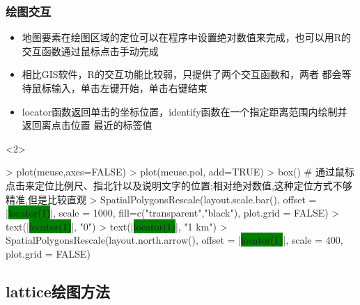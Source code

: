 \subsubsection{绘图交互}
\begin{frame}[t,fragile]{\subsecname}{\subsubsecname}
\begin{itemize} 
\item<1-> 地图要素在绘图区域的定位可以在程序中设置绝对数值来完成，也可以用R的交互函数通过鼠标点击手动完成
\item<2-> 相比GIS软件，R的交互功能比较弱，只提供了两个交互函数和，两者
都会等待鼠标输入，单击左键开始，单击右键结束
\item<2-> locator函数返回单击的坐标位置，identify函数在一个指定距离范围内绘制并返回离点击位置
最近的标签值
\end{itemize}

\begin{overlayarea}{\textwidth}{\textheight}
\begin{onlyenv}<2>
\begin{rcode}
> plot(meuse,axes=FALSE)
> plot(meuse.pol, add=TRUE)
> box()
# 通过鼠标点击来定位比例尺、指北针以及说明文字的位置;相对绝对数值,这种定位方式不够精准,但是比较直观
> SpatialPolygonsRescale(layout.scale.bar(), offset = |\colorbox{green}{locator(1)}|, scale = 1000, fill=c("transparent","black"), plot.grid = FALSE)
> text(|\colorbox{green}{locator(1)}|, "0")
> text(|\colorbox{green}{locator(1)}|, "1 km")
> SpatialPolygonsRescale(layout.north.arrow(), offset = |\colorbox{green}{locator(1)}|, scale = 400, plot.grid = FALSE)
\end{rcode}
\end{onlyenv}
\end{overlayarea}
\end{frame}

\subsection{lattice绘图方法}
